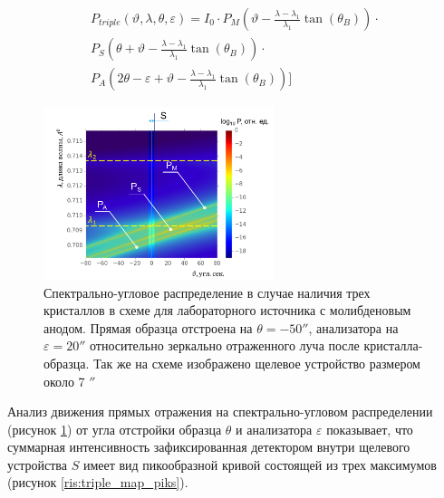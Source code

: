 \begin{eqnarray} \label{eq:triplr_spectra_angle_map}
  P_{triple}(\vartheta,\lambda,\theta,\varepsilon) =I_0\cdot
    P_M \left(\vartheta - \frac{\lambda - \lambda_1}{\lambda_1}\tan(\theta_B) \right) \cdot \nonumber \\
   P_S \left(\theta + \vartheta - \frac{\lambda - \lambda_1}{\lambda_1}\tan(\theta_B)\right)  \cdot  \nonumber \\
   P_A \left(2\theta - \varepsilon + \vartheta - \frac{\lambda - \lambda_1}{\lambda_1}\tan(\theta_B)\right) \Bigg]
 \end{eqnarray}

  \begin{figure}[H]
    \centering
    \includegraphics[width=0.6\textwidth]{images/triple_map.png}
    \caption{Спектрально-угловое распределение в случае наличия трех кристаллов в схеме для
    лабораторного источника с молибденовым анодом.
    Прямая образца отстроена на $\theta = - 50''$, анализатора на $\varepsilon = 20''$ относительно
    зеркально отраженного луча после кристалла-образца. Так же на схеме изображено щелевое устройство размером около 7 $''$}
    \label{ris:triple_map}
  \end{figure}

Анализ движения прямых отражения на спектрально-угловом распределении (рисунок \ref{ris:triple_map}) от угла отстройки образца $\theta$ и
анализатора $\varepsilon$ показывает, что суммарная интенсивность зафиксированная детектором внутри щелевого устройства
$S$ имеет вид пикообразной кривой состоящей из трех максимумов (рисунок \ref{ris:triple_map_piks}).

